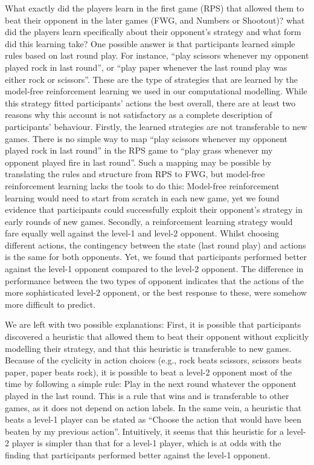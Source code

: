 \documentclass[english,man,floatsintext]{apa6}
\begin{document}
What exactly did the players learn in the first game (RPS) that allowed them to beat their opponent in the later games (FWG, and Numbers or Shootout)? what did the players learn specifically about their opponent's strategy and what form did this learning take?
One possible answer is that participants learned simple rules based on last round play. For instance, \enquote{play scissors whenever my opponent played rock in last round}, or \enquote{play paper whenever the last round play was either rock or scissors}. These are the type of strategies that are learned by the model-free reinforcement learning we used in our computational modelling. While this strategy fitted participants' actions the best overall, there are at least two reasons why this account is not satisfactory as a complete description of participants' behaviour. Firstly, the learned strategies are not transferable to new games. There is no simple way to map \enquote{play scissors whenever my opponent played rock in last round} in the RPS game to \enquote{play grass whenever my opponent played fire in last round}. Such a mapping may be possible by translating the rules and structure from RPS to FWG, but model-free reinforcement learning lacks the tools to do this: Model-free reinforcement learning would need to start from scratch in each new game, yet we found evidence that participants could successfully exploit their opponent's strategy in early rounds of new games. Secondly, a reinforcement learning strategy would fare equally well against the level-1 and level-2 opponent. Whilst choosing different actions, the contingency between the state (last round play) and actions is the same for both opponents. Yet, we found that participants performed better against the level-1 opponent compared to the level-2 opponent. The difference in performance between the two types of opponent indicates that the actions of the more sophisticated level-2 opponent, or the best response to these, were somehow more difficult to predict.

We are left with two possible explanations: First, it is possible that participants discovered a heuristic that allowed them to beat their opponent without explicitly modelling their strategy, and that this heuristic is transferable to new games. Because of the cyclicity in action choices (e.g., rock beats scissors, scissors beats paper, paper beats rock), it is possible to beat a level-2 opponent most of the time by following a simple rule: Play in the next round whatever the opponent played in the last round. This is a rule that wins and is transferable to other games, as it does not depend on action labels. In the same vein, a heuristic that beats a level-1 player can be stated as \enquote{Choose the action that would have been beaten by my previous action}. Intuitively, it seems that this heuristic for a level-2 player is simpler than that for a level-1 player, which is at odds with the finding that participants performed better against the level-1 opponent.
\end{document}
